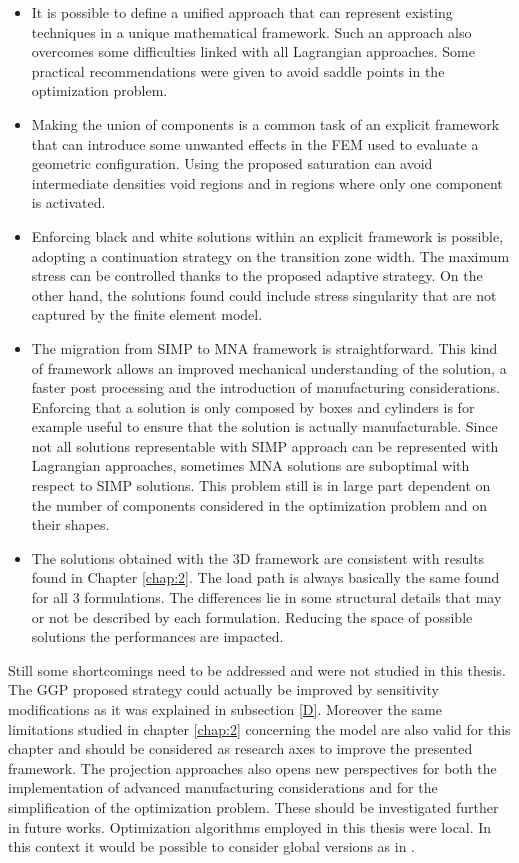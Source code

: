 \begin{itemize}
\item It is possible to define a unified approach that can represent existing techniques in a unique mathematical framework. Such an approach also overcomes some difficulties linked with all Lagrangian approaches. Some practical recommendations were given to avoid saddle points in the optimization problem. 
\item Making the union of components is a common task of an explicit framework that can introduce some unwanted effects in the FEM used to evaluate a geometric configuration. Using the proposed saturation can avoid intermediate densities void regions and in regions where only one component is activated.
\item Enforcing black and white solutions within an explicit framework is possible, adopting a continuation strategy on the transition zone width. The maximum stress can be controlled thanks to the proposed adaptive strategy. On the other hand, the solutions found could include stress singularity that are not captured by the finite element model.
\item The migration from SIMP to MNA framework is straightforward. This kind of framework allows an improved mechanical understanding of the solution, a faster post processing and the introduction of manufacturing considerations. Enforcing that a solution is only composed by boxes and cylinders is for example useful to ensure that the solution is actually manufacturable. Since not all solutions representable with SIMP approach can be represented with Lagrangian approaches, sometimes MNA solutions are suboptimal with respect to SIMP solutions. This problem still is in large part dependent on the number of components considered in the optimization problem and on their shapes. 
\item The solutions obtained with the 3D framework are consistent with results found in Chapter \ref{chap:2}. The load path is always basically the same found for all 3 formulations. The differences lie in some structural details that may or not be described by each formulation. Reducing the space of possible solutions the performances are impacted.  
\end{itemize}
Still some shortcomings need to be addressed and were not studied in this thesis. The GGP proposed strategy could actually be improved by sensitivity modifications as it was explained in subsection \ref{D}. Moreover the same limitations studied in chapter \ref{chap:2} concerning the model are also valid for this chapter and should be considered as research axes to improve the presented framework. The projection approaches also opens new perspectives for both the implementation of advanced manufacturing considerations and for the simplification of the optimization problem. These should be investigated further in future works. Optimization algorithms employed in this thesis were local. In this context it would be possible to consider global versions as in \cite{zhang2018finding}.


